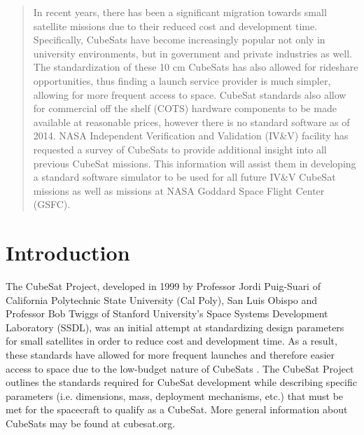 \documentclass[11pt]{article}
\begin{document}
\maketitle

\begin{abstract}
In recent years, there has been a significant migration towards small satellite missions due to their reduced cost and development time.  Specifically, CubeSats have become increasingly popular not only in university environments, but in government and private industries as well.  The standardization of these 10 cm CubeSats has also allowed for rideshare opportunities, thus finding a launch service provider is much simpler, allowing for more frequent access to space.  CubeSat standards also allow for commercial off the shelf (COTS) hardware components to be made available at reasonable prices, however there is no standard software as of 2014.  NASA Independent Verification and Validation (IV\&V) facility has requested a survey of CubeSats to provide additional insight into all previous CubeSat missions.  This information will assist them in developing a standard software simulator to be used for all future IV\&V CubeSat missions as well as missions at NASA Goddard Space Flight Center (GSFC).
\end{abstract}

\section{Introduction}
The CubeSat Project, developed in 1999 by Professor Jordi Puig-Suari of California Polytechnic State University (Cal Poly), San Luis Obispo and Professor Bob Twiggs of Stanford University's Space Systems Development Laboratory (SSDL), was an initial attempt at standardizing design parameters for small satellites in order to reduce cost and development time.  As a result, these standards have allowed for more frequent launches and therefore easier access to space due to the low-budget nature of CubeSats \cite{CalPoly}.  The CubeSat Project outlines the standards required for CubeSat development while describing specific parameters (i.e. dimensions, mass, deployment mechanisms, etc.) that must be met for the spacecraft to qualify as a CubeSat.  More general information about CubeSats may be found at cubesat.org.
\end{document}
